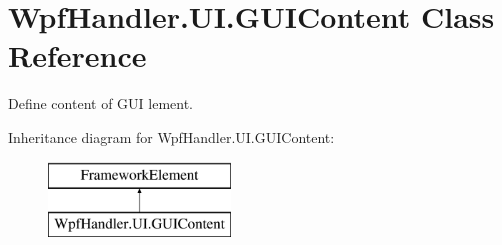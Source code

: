 \hypertarget{class_wpf_handler_1_1_u_i_1_1_g_u_i_content}{}\section{Wpf\+Handler.\+U\+I.\+G\+U\+I\+Content Class Reference}
\label{class_wpf_handler_1_1_u_i_1_1_g_u_i_content}


Define content of G\+UI lement.  


Inheritance diagram for Wpf\+Handler.\+U\+I.\+G\+U\+I\+Content\+:\begin{figure}[H]
\begin{center}
\leavevmode
\includegraphics[height=2.000000cm]{db/dd5/class_wpf_handler_1_1_u_i_1_1_g_u_i_content}
\end{center}
\end{figure}
